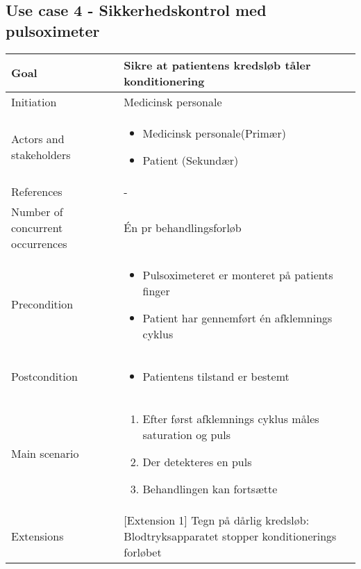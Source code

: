 	\subsection{Use case 4 - Sikkerhedskontrol med pulsoximeter}
		\begin{center}
			\begin{tabular}{ | m{4cm} | m{8cm}| } 
				\hline
				Goal& Sikre at patientens kredsløb tåler konditionering\\ 
				\hline
				Initiation &  Medicinsk personale\\
				\hline
				Actors and stakeholders & 
				\begin{itemize}
					\item Medicinsk personale(Primær)
					\item Patient (Sekundær)
				\end{itemize} \\ 
				\hline
				References & - \\ 
				\hline
				Number of concurrent occurrences & Én pr behandlingsforløb \\ 
				\hline	
				Precondition & 
				\begin{itemize}
					\item Pulsoximeteret er monteret på patients finger
					\item Patient har gennemført én afklemnings cyklus
				\end{itemize} \\ 
				\hline
				Postcondition & 
				\begin{itemize}
					\item Patientens tilstand er bestemt 
				\end{itemize} \\ 
				\hline
				Main scenario & \begin{enumerate}
					\item Efter først afklemnings cyklus måles saturation og puls
					\item Der detekteres en puls
					\item Behandlingen kan fortsætte
				\end{enumerate} \\ 
				\hline
				Extensions & [Extension 1] Tegn på dårlig kredsløb: Blodtryksapparatet stopper konditionerings forløbet\\ 
				\hline
			\end{tabular}
		\end{center}